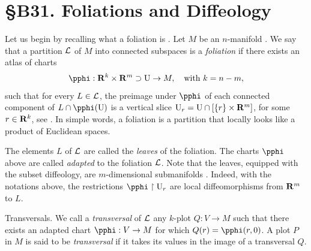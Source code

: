 
\chapter*{\S B31. Foliations and Diffeology}
\setcounter{footnote}{0}


\begin{abstract}
  Spaces of leaves of foliations on manifolds are among the first examples we can think of when it comes to diffeology.
  Paradoxically,
  with the exception of Kronecker's foliation of a torus by an irrational line,
  I have not delved into this class of examples in the textbook.
  In \cite{IL90} we treated the particular case of the foliation of an $n$-dimensional torus $\Torus^n$ by an irrational hyperplane.
  In this note we go a little further into what diffeology can say about the space of leaves of a foliated manifold.
\end{abstract}


Let us begin by recalling what a foliation is \cite{Law74}.
Let $M$ be an $n$-manifold \cite[4.1]{PIZ13}.
We say that a partition $\mathcal{L}$ of $M$ into connected subspaces
is a {\em foliation} if there exists an atlas of charts
$$
  \pphi : \RR^k \times \RR^m \supset \U \to M, \quad \text{with } k = n-m,
$$
such that for every $L \in \mathcal{L}$,
the preimage under $\pphi$ of each connected component of $L \cap \pphi(\U)$ is a vertical slice $\mathrm{U}_r = \mathrm{U} \cap [\{r\} \times \mathbf{R}^m]$,
for some $r \in \mathbf{R}^k$,
see \cite[1.33, 5.7]{PIZ13}.
In simple words,
a foliation is a partition that locally looks like a product of Euclidean spaces.

The elements $L$ of $\mathcal{L}$ are called the {\em leaves} of the foliation.
The charts $\pphi$ above are called {\em adapted} to the foliation $\mathcal{L}$.
Note that the leaves,
equipped with the subset diffeology,
are $m$-dimensional submanifolds \cite[4.4]{PIZ13}.
Indeed,
with the notations above,
the restrictions $\pphi \restriction \U_r$ are local diffeomorphisms
from $\mathbf{R}^m$ to $L$.

\begin{Article}{Transversals.}{}
  We call a {\em transversal} of $\mathcal{L}$ any $k$-plot $Q : V \to M$ such that there exists an adapted chart $\pphi : V \to M$ for which $Q(r) = \pphi(r,0)$.
  A plot $P$ in $M$ is said to be {\em transversal} if it takes its values in the image of a transversal $Q$.
\end{Article}

